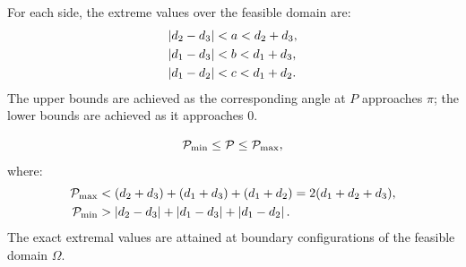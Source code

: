 \begin{proposition}
For each side, the extreme values over the feasible domain are:
\begin{align}
\left\lvert d_2 - d_3 \right\rvert &< a < d_2 + d_3, \\
\left\lvert d_1 - d_3 \right\rvert &< b < d_1 + d_3, \\
\left\lvert d_1 - d_2 \right\rvert &< c < d_1 + d_2.
\end{align}
The upper bounds are achieved as the corresponding angle at $P$ approaches $\pi$; the lower bounds are achieved as it approaches $0$.
\end{proposition}

\begin{corollary}
\begin{equation}
\mathcal{P}_{\min} \leq \mathcal{P} \leq \mathcal{P}_{\max},
\end{equation}
where:
\begin{align}
\mathcal{P}_{\max} &< (d_2 + d_3) + (d_1 + d_3) + (d_1 + d_2) = 2(d_1 + d_2 + d_3), \\
\mathcal{P}_{\min} &> \left\lvert d_2 - d_3 \right\rvert + \left\lvert d_1 - d_3 \right\rvert + \left\lvert d_1 - d_2 \right\rvert.
\end{align}
The exact extremal values are attained at boundary configurations of the feasible domain $\Omega$.
\end{corollary}
